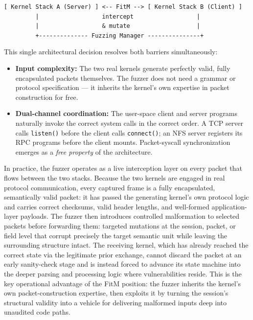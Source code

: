 \documentclass[10pt]{article}
\begin{document}
\begin{lstlisting}
[ Kernel Stack A (Server) ] <-- FitM --> [ Kernel Stack B (Client) ]
         |                  intercept                  |
         |                  & mutate                   |
         +-------------- Fuzzing Manager ---------------+
\end{lstlisting}

This single architectural decision resolves both barriers simultaneously:

\begin{itemize}
  \item \textbf{Input complexity:} The two real kernels generate perfectly valid, fully encapsulated packets themselves. The fuzzer does not need a grammar or protocol specification --- it inherits the kernel's own expertise in packet construction for free.
  \item \textbf{Dual-channel coordination:} The user-space client and server programs naturally invoke the correct system calls in the correct order. A TCP server calls \texttt{listen()} before the client calls \texttt{connect()}; an NFS server registers its RPC programs before the client mounts. Packet-syscall synchronization emerges as a \emph{free property} of the architecture.
\end{itemize}

In practice, the fuzzer operates as a live interception layer on every packet that flows between the two stacks. Because the two kernels are engaged in real protocol communication, every captured frame is a fully encapsulated, semantically valid packet: it has passed the generating kernel's own protocol logic and carries correct checksums, valid header lengths, and well-formed application-layer payloads. The fuzzer then introduces controlled malformation to selected packets before forwarding them: targeted mutations at the session, packet, or field level that corrupt precisely the target semantic unit while leaving the surrounding structure intact. The receiving kernel, which has already reached the correct state via the legitimate prior exchange, cannot discard the packet at an early sanity-check stage and is instead forced to advance its state machine into the deeper parsing and processing logic where vulnerabilities reside. This is the key operational advantage of the FitM position: the fuzzer inherits the kernel's own packet-construction expertise, then exploits it by turning the session's structural validity into a vehicle for delivering malformed inputs deep into unaudited code paths.
\end{document}
